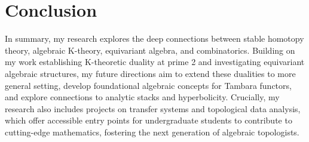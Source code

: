 \documentclass[11pt]{article}
\begin{document}
\section{Conclusion}
In summary, my research explores the deep connections between stable homotopy theory, algebraic K-theory, equivariant algebra, and combinatorics. Building on my work establishing K-theoretic duality at prime 2 and investigating equivariant algebraic structures, my future directions aim to extend these dualities to more general setting, develop foundational algebraic concepts for Tambara functors, and explore connections to analytic stacks and hyperbolicity. Crucially, my research also includes projects on transfer systems and topological data analysis, which offer accessible entry points for undergraduate students to contribute to cutting-edge mathematics, fostering the next generation of algebraic topologists.



\end{document}
